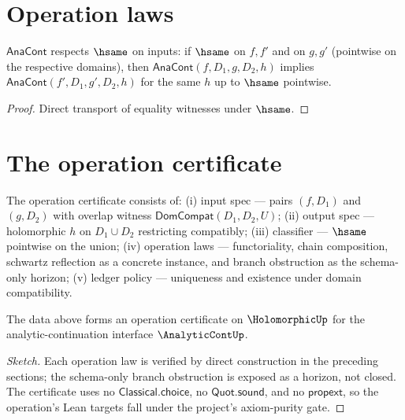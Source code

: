 \section{Operation laws}

\begin{lemma}[Functoriality]
\label{lem:ana-cont-functorial}
\(\mathsf{AnaCont}\) respects \(\hsame\) on inputs: if \(\hsame\) on \(f, f'\) and on \(g, g'\) (pointwise on the respective domains), then \(\mathsf{AnaCont}(f, D_1, g, D_2, h)\) implies \(\mathsf{AnaCont}(f', D_1, g', D_2, h)\) for the same \(h\) up to \(\hsame\) pointwise.
\end{lemma}
\begin{proof}
Direct transport of equality witnesses under \(\hsame\).
\end{proof}

\section{The operation certificate}

\begin{definition}
\label{def:ana-cont-op-cert}
The operation certificate consists of: (i) input spec --- pairs \((f, D_1)\) and \((g, D_2)\) with overlap witness \(\mathsf{DomCompat}(D_1, D_2, U)\); (ii) output spec --- holomorphic \(h\) on \(D_1 \cup D_2\) restricting compatibly; (iii) classifier --- \(\hsame\) pointwise on the union; (iv) operation laws --- functoriality, chain composition, schwartz reflection as a concrete instance, and branch obstruction as the schema-only horizon; (v) ledger policy --- uniqueness and existence under domain compatibility.
\end{definition}

\begin{theorem}
\label{thm:analytic-continuation-operation}
The data above forms an operation certificate on \(\HolomorphicUp\) for the analytic-continuation interface \(\AnalyticContUp\).
\end{theorem}
\begin{proof}[Sketch]
Each operation law is verified by direct construction in the preceding sections; the schema-only branch obstruction is exposed as a horizon, not closed. The certificate uses no \(\mathsf{Classical.choice}\), no \(\mathsf{Quot.sound}\), and no \(\mathsf{propext}\), so the operation's Lean targets fall under the project's axiom-purity gate.
\end{proof}

